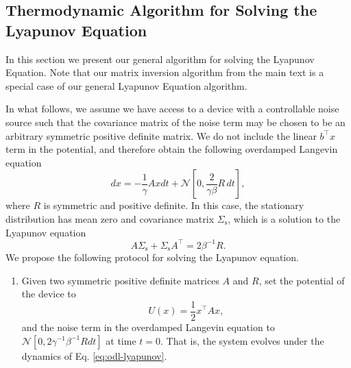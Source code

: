 \documentclass[prx,onecolumn,floatfix,longbibliography,notitlepage, nofootinbib,12pt]{revtex4-2}
\begin{document}
\begin{appendix}
\section{Thermodynamic Algorithm for Solving the Lyapunov Equation}

In this section we present our general algorithm for solving the Lyapunov Equation. Note that our matrix inversion algorithm from the main text is a special case of our general Lyapunov Equation algorithm. 

In what follows, we assume we have access to a device with a controllable noise source such that the covariance matrix of the noise term may be chosen to be an arbitrary symmetric positive definite matrix. We do not include the linear $b^\intercal x$ term in the potential, and therefore obtain the following overdamped Langevin equation
\begin{equation}
\label{eq:odl-lyapunov}
    dx = -\frac{1}{\gamma}A x dt + \mathcal{N}\left[0, \frac{2}{\gamma \beta } R\, dt\right],
\end{equation}
where $R$ is symmetric and positive definite.
In this case, the stationary distribution has mean zero and covariance matrix $\Sigma_\text{s}$, which is a solution to the Lyapunov equation
 \begin{equation}\label{eq:Lyapunov}
     A\Sigma_\text{s}+ \Sigma_\text{s} A^{\intercal} = 2\beta^{-1}R.
 \end{equation}
We propose the following protocol for solving the Lyapunov equation.
\medskip
\begin{tcolorbox}[title={Lyapunov Equation Protocol},breakable]
\begin{enumerate}
\item Given two symmetric positive definite matrices $A$ and $R$, set the potential of the device to
\begin{equation}
    U(x) = \frac{1}{2} x^\intercal A x,
\end{equation}
and the noise term in the overdamped Langevin equation to $\mathcal{N}\left[0,2\gamma^{-1}\beta^{-1} R dt\right]$ at time $t=0$. That is, the system evolves under the dynamics of Eq. \eqref{eq:odl-lyapunov}.


\end{enumerate}
\end{tcolorbox}
\end{appendix}
\end{document}
